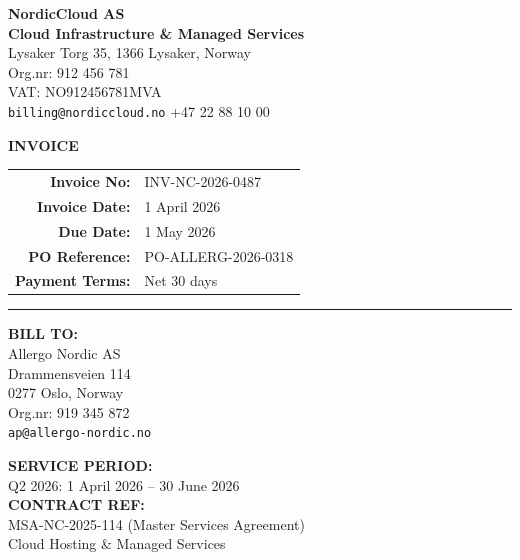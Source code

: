 \documentclass[a4paper,11pt]{article}
\begin{document}
\noindent
\begin{minipage}[t]{0.55\textwidth}
  {\color{brand}\huge\bfseries NordicCloud AS}\\[4pt]
  {\large\bfseries Cloud Infrastructure \& Managed Services}\\[8pt]
  \small
  Lysaker Torg 35, 1366 Lysaker, Norway\\
  Org.nr: 912 456 781\\
  VAT: NO912456781MVA\\
  \texttt{billing@nordiccloud.no} \quad +47 22 88 10 00
\end{minipage}
\hfill
\begin{minipage}[t]{0.38\textwidth}
  \raggedleft
  \colorbox{brand}{\color{white}\bfseries\Large\quad INVOICE \quad}\\[8pt]
  \begin{tabular}{rl}
    \textbf{Invoice No:}   & INV-NC-2026-0487 \\
    \textbf{Invoice Date:} & 1 April 2026 \\
    \textbf{Due Date:}     & 1 May 2026 \\
    \textbf{PO Reference:} & PO-ALLERG-2026-0318 \\
    \textbf{Payment Terms:}& Net 30 days \\
  \end{tabular}
\end{minipage}

\vspace{18pt}
\noindent\rule{\textwidth}{1.5pt}
\vspace{6pt}

\noindent
\begin{minipage}[t]{0.45\textwidth}
  \textbf{\textcolor{brand}{BILL TO:}}\\[4pt]
  Allergo Nordic AS\\
  Drammensveien 114\\
  0277 Oslo, Norway\\
  Org.nr: 919 345 872\\
  \texttt{ap@allergo-nordic.no}
\end{minipage}
\hfill
\begin{minipage}[t]{0.45\textwidth}
  \textbf{\textcolor{brand}{SERVICE PERIOD:}}\\[4pt]
  Q2 2026: 1 April 2026 -- 30 June 2026\\[4pt]
  \textbf{\textcolor{brand}{CONTRACT REF:}}\\[4pt]
  MSA-NC-2025-114 (Master Services Agreement)\\
  Cloud Hosting \& Managed Services
\end{minipage}
\end{document}
